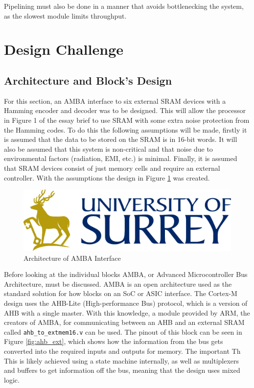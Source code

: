 \documentclass[11pt]{article}
\begin{document}
Pipelining must also be done in a manner that avoids bottlenecking the system, as the slowest module limits throughput.


\section{Design Challenge}
\subsection{Architecture and Block's Design} \label{sec:block}
For this section, an AMBA interface to six external SRAM devices with a Hamming encoder and decoder was to be designed.
This will allow the processor in Figure 1 of the essay brief to use SRAM with some extra noise protection from the Hamming codes.
To do this the following assumptions will be made, firstly it is assumed that the data to be stored on the SRAM is in 16-bit words.
It will also be assumed that this system is non-critical and that noise due to environmental factors (radiation, EMI, etc.) is minimal. 
Finally, it is assumed that SRAM devices consist of just memory cells and require an external controller.
With the assumptions the design in Figure \ref{fig:amba} was created.

\begin{figure}[H]        
    \centering
    \includegraphics[width=\textwidth]{logo.png}
    \caption{Architecture of AMBA Interface}
    \label{fig:amba}
\end{figure} 

Before looking at the individual blocks AMBA, or Advanced Microcontroller Bus Architecture, must be discussed.
AMBA is an open architecture used as the standard solution for how blocks on an SoC or ASIC interface\cite{amba}.
The Cortex-M design uses the AHB-Lite (High-performance Bus) protocol, which is a version of AHB with a single master.
With this knowledge, a module provided by ARM, the creators of AMBA,
for communicating between an AHB and an external SRAM called \texttt{ahb\_to\_extmem16.v} can be used\cite{sram_arm}.
The pinout of this block can be seen in Figure \ref{fig:ahb_ext}, which shows how the information from the bus gets converted into the required inputs and outputs for memory.
The important
Th
This is likely achieved using a state machine internally, as well as multiplexers and buffers to get information off the bus, meaning that the design uses mixed logic.
\end{document}
